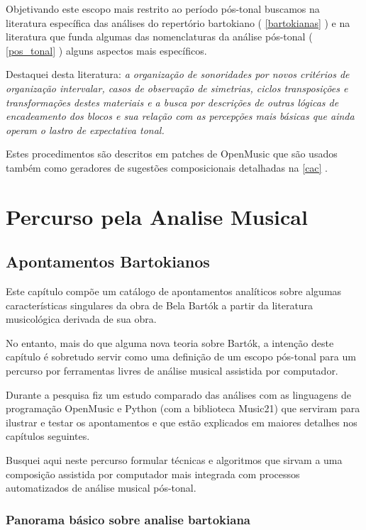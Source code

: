 \documentclass[
	12pt,				%
	openright,			%
	twoside,			%
	a4paper,			%
	english,			%
	french,				%
	spanish,			%
	brazil				%
	]{abntex2}
\begin{document}
Objetivando este escopo mais restrito ao período pós-tonal buscamos na literatura específica das análises do repertório bartokiano ( \autoref{bartokianas} ) e na literatura que funda algumas das nomenclaturas da análise pós-tonal ( \autoref{pos_tonal} ) alguns aspectos mais específicos. 

Destaquei desta literatura: \textit{a organização de sonoridades por novos critérios de organização intervalar, casos de observação de simetrias, ciclos transposições e transformações destes materiais e a busca por descrições de outras lógicas de encadeamento dos blocos e sua relação com as percepções mais básicas que ainda operam o lastro de expectativa tonal.} 

Estes procedimentos são descritos em patches de OpenMusic que são usados também como geradores de sugestões composicionais detalhadas na \autoref{cac} .


\part{Percurso pela Analise Musical }


\chapter{Apontamentos Bartokianos}
\label{bartokianas}

Este capítulo compõe um catálogo de apontamentos analíticos sobre algumas características singulares da obra de Bela Bartók a partir da literatura musicológica derivada de sua obra.

No entanto, mais do que alguma nova teoria sobre Bartók, a intenção deste capítulo é sobretudo servir como uma definição de um escopo pós-tonal para um percurso por ferramentas livres de análise musical assistida por computador.

Durante a pesquisa fiz um estudo comparado das análises com as linguagens de programação OpenMusic e Python (com a biblioteca Music21)  que serviram para ilustrar e testar os apontamentos e que estão explicados em maiores detalhes nos capítulos seguintes.

Busquei aqui neste percurso formular técnicas e algoritmos que sirvam a uma composição assistida por computador mais integrada com processos automatizados de análise musical pós-tonal.


\section{Panorama básico sobre analise bartokiana}
\end{document}
